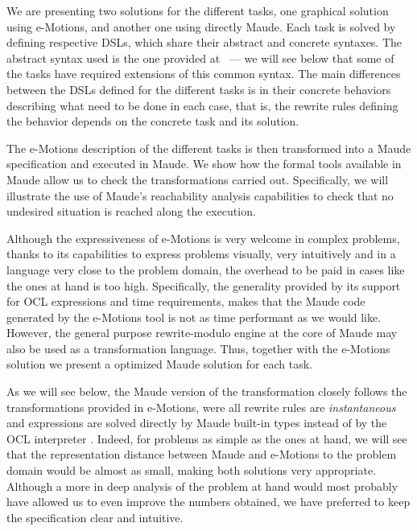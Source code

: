 
We are presenting two solutions for the different tasks, one graphical solution using e-Motions, and another one using directly Maude. Each task is solved by defining respective DSLs, which share their abstract and concrete syntaxes. The abstract syntax used is the one provided at~\cite{imdbsources} --- we will see below that some of the tasks have required extensions of this common syntax. The main differences between the DSLs defined for the different tasks is in their  concrete behaviors describing what need to be done in each case, that is, the rewrite rules defining the behavior depends on the concrete task and its solution. 

The e-Motions description of the different tasks is then transformed into a Maude specification and executed in Maude. We show how the formal tools available in Maude allow us to check the transformations carried out. Specifically, we will illustrate the use of Maude's reachability analysis capabilities to check that no undesired situation is reached along the execution. 

Although the expressiveness of e-Motions is very welcome in complex problems, thanks to its capabilities to express problems visually, very intuitively and in a language very close to the problem domain, the overhead to be paid in cases like the ones at hand is too high. Specifically, the generality provided by its support for OCL expressions and time requirements, makes that the Maude code generated by the e-Motions tool is not as time performant as we would like. However, the general purpose rewrite-modulo engine at the core of Maude may also be used as a transformation language. Thus, together with the e-Motions solution we present a optimized Maude solution for each task.  

As we will see below, the Maude version of the transformation closely follows the transformations provided in e-Motions, were all rewrite rules are \textit{instantaneous} and expressions are solved directly by Maude built-in types instead of by the OCL interpreter \cite{Roldan-Duran:2008-tr}. Indeed, for problems as simple as the ones at hand, we will see that the representation distance between Maude and e-Motions to the problem domain would be almost as small, making both solutions very appropriate. Although a more in deep analysis of the problem at hand would most probably have allowed us to even improve the numbers obtained, we have preferred to keep the specification clear and intuitive.

